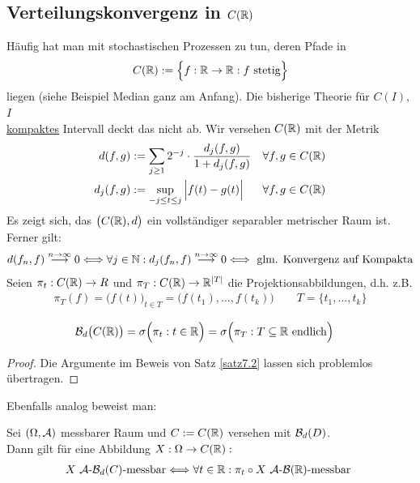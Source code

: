\subsection{Verteilungskonvergenz in \texorpdfstring{$C(\mathbb{R})$}{C(R)}}
Häufig hat man mit stochastischen Prozessen zu tun, deren Pfade in
\begin{align*}
	C(\mathbb{R}):=\Big\lbrace f:\mathbb{R}\to\mathbb{R}:f\text{ stetig}\Big\rbrace
\end{align*}
liegen (siehe Beispiel Median ganz am Anfang). Die bisherige Theorie für $C(I)$, $I$\\ \underline{kompaktes} Intervall deckt das nicht ab. Wir versehen $C(\mathbb{R})$ mit der Metrik
\begin{align*}
	d(f,g)&:=\sum\limits_{j\geq 1} 2^{-j}\cdot\frac{d_j(f,g)}{1+d_j(f,g)} &\forall f,g\in C(\mathbb{R})\\
	d_j(f,g)&:=\sup\limits_{-j\leq t\leq j}\Big|f(t)-g(t)\Big| &\forall f,g\in C(\mathbb{R})
\end{align*}
Es zeigt sich, das $\big(C(\mathbb{R}),d\big)$ ein vollständiger separabler metrischer Raum ist. Ferner gilt:
\begin{align*}
	d(f_n,f)\stackrel{n\to\infty}{\longrightarrow}0
	\Longleftrightarrow \forall j\in\mathbb{N}: d_j(f_n,f)\stackrel{n\to\infty}{\longrightarrow}0
	\Longleftrightarrow\text{ glm. Konvergenz auf Kompakta}
\end{align*}
Seien $\pi_t:C(\mathbb{R})\to R$ und $\pi_T:C(\mathbb{R})\to\mathbb{R}^{|T|}$ die Projektionsabbildungen, d.h. z.B.
\begin{align*}
	\pi_T(f)=\big(f(t)\big)_{t\in T}=\Big(f(t_1),\ldots,f(t_k)\Big)\qquad
	T=\lbrace t_1,\ldots, t_k\rbrace
\end{align*}

\begin{theorem}\label{theorem7.20}
	\begin{align*}
		\mathcal{B}_d\big(C(\mathbb{R})\big)&=\sigma\Big(\pi_t:t\in\mathbb{R}\Big)=\sigma\Big(\pi_T:T\subseteq\mathbb{R}\text{ endlich}\Big)
	\end{align*}
\end{theorem}

\begin{proof}
	Die Argumente im Beweis von Satz \ref{satz7.2} lassen sich problemlos übertragen.
\end{proof}

Ebenfalls analog beweist man:

\begin{satz}\label{satz7.21}
	 Sei $(\Omega,\mathcal{A})$ messbarer Raum und $C:=C(\mathbb{R})$ versehen mit $\mathcal{B}_d(D)$.\\
	 Dann gilt für eine Abbildung $X:\Omega\to C(\mathbb{R}):$
	 \begin{align*}
	 	X~\mathcal{A}\text{-}\mathcal{B}_d(C)\text{-messbar}
	 	\Longleftrightarrow\forall t\in\mathbb{R}:
	 	\pi_t\circ X~\mathcal{A}\text{-}\mathcal{B}(\mathbb{R})\text{-messbar }
	 \end{align*}
\end{satz}

